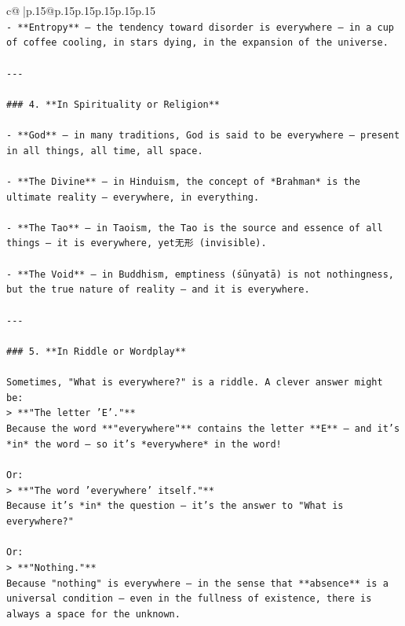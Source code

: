 \documentclass{article}
\begin{document}
{\begin{supertabular}{c@{$\;$}|p{.15\linewidth}@{}p{.15\linewidth}p{.15\linewidth}p{.15\linewidth}p{.15\linewidth}p{.15\linewidth}}
{{{\\ 
\texttt{{-} **Entropy** — the tendency toward disorder is everywhere — in a cup of coffee cooling, in stars dying, in the expansion of the universe.} \\
\\ 
\texttt{{-}{-}{-}} \\
\\ 
\texttt{\#\#\# 4. **In Spirituality or Religion**} \\
\\ 
\texttt{{-} **God** — in many traditions, God is said to be everywhere — present in all things, all time, all space.} \\
\\ 
\texttt{{-} **The Divine** — in Hinduism, the concept of *Brahman* is the ultimate reality — everywhere, in everything.} \\
\\ 
\texttt{{-} **The Tao** — in Taoism, the Tao is the source and essence of all things — it is everywhere, yet无形 (invisible).} \\
\\ 
\texttt{{-} **The Void** — in Buddhism, emptiness (śūnyatā) is not nothingness, but the true nature of reality — and it is everywhere.} \\
\\ 
\texttt{{-}{-}{-}} \\
\\ 
\texttt{\#\#\# 5. **In Riddle or Wordplay**} \\
\\ 
\texttt{Sometimes, "What is everywhere?" is a riddle. A clever answer might be:} \\
\texttt{> **"The letter 'E'."**  } \\
\texttt{Because the word **"everywhere"** contains the letter **E** — and it’s *in* the word — so it’s *everywhere* in the word!} \\
\\ 
\texttt{Or:} \\
\texttt{> **"The word 'everywhere' itself."**  } \\
\texttt{Because it’s *in* the question — it’s the answer to "What is everywhere?"} \\
\\ 
\texttt{Or:} \\
\texttt{> **"Nothing."**  } \\
\texttt{Because "nothing" is everywhere — in the sense that **absence** is a universal condition — even in the fullness of existence, there is always a space for the unknown.} \\
}}}
\end{supertabular}}
\end{document}
